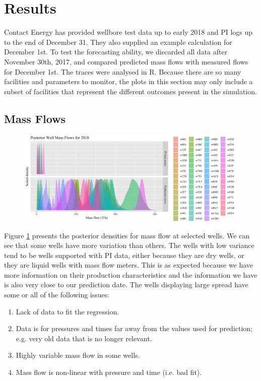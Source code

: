 \documentclass[a4paper, 12pt]{article}
\begin{document}
\section{Results}
Contact Energy has provided wellbore test data up to early 2018 and PI logs up to the end of December 31. They also supplied an example calculation for December 1st. To test the forecasting ability, we discarded all data after November 30th, 2017, and compared predicted mass flows with measured flows for December 1st. The traces were analysed in R. Because there are so many facilities and parameters to monitor, the plots in this section may only include a subset of facilities that represent the different outcomes present in the simulation.

\subsection{Mass Flows}
\begin{figure}
\centering
  \includegraphics[width=\linewidth]{media/mf_wells}
  \label{fig:mf_wells}
\end{figure}

Figure \ref{fig:mf_wells} presents the posterior densities for mass flow at selected wells. We can see that some wells have more variation than others. The wells with low variance tend to be wells supported with PI data, either because they are dry wells, or they are liquid wells with mass flow meters. This is as expected because we have more information on their production characteristics and the information we have is also very close to our prediction date. The wells displaying large spread have some or all of the following issues:

\begin{enumerate}
\item Lack of data to fit the regression.
\item Data is for pressures and times far away from the values used for prediction; e.g. very old data that is no longer relevant.
\item Highly variable mass flow in some wells.
\item Mass flow is non-linear with pressure and time (i.e. bad fit).

\end{enumerate}
\end{document}
